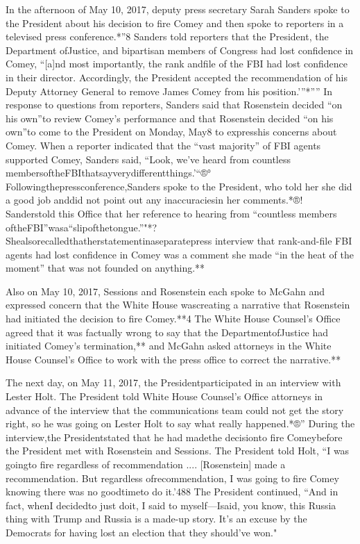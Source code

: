 {In the afternoon of May 10, 2017, deputy press secretary Sarah Sanders spoke to the President about his decision to fire Comey and then spoke to reporters in a televised press conference.*”8
Sanders told reporters that the President, the Department ofJustice, and bipartisan members of Congress had lost confidence in Comey, “[a]nd most importantly, the rank andfile of the FBI had lost confidence in their director.
Accordingly, the President accepted the recommendation of his Deputy Attorney General to remove James Comey from his position.’”*””
In response to questions from reporters, Sanders said that Rosenstein decided “on his own”to review Comey’s performance and that Rosenstein decided “on his own”to come to the President on Monday, May8 to expresshis concerns about Comey.
When a reporter indicated that the “vast majority” of FBI agents supported Comey, Sanders said, “Look, we’ve heard from countless membersoftheFBIthatsayverydifferentthings.’“®°
Followingthepressconference,Sanders spoke to the President, who told her she did a good job anddid not point out any inaccuraciesin her comments.*®!
Sanderstold this Office that her reference to hearing from “countless members oftheFBI”wasa“slipofthetongue.”"*?
Shealsorecalledthatherstatementinaseparatepress interview that rank-and-file FBI agents had lost confidence in Comey was a comment she made “in the heat of the moment” that was not founded on anything.**

Also on May 10, 2017, Sessions and Rosenstein each spoke to McGahn and expressed concern that the White House wascreating a narrative that Rosenstein had initiated the decision to fire Comey.**4
The White House Counsel’s Office agreed that it was factually wrong to say that the DepartmentofJustice had initiated Comey’s termination,**
and McGahn asked attorneys in the White House Counsel’s Office to work with the press office to correct the narrative.**

The next day, on May 11, 2017, the Presidentparticipated in an interview with Lester Holt.
The President told White House Counsel’s Office attorneys in advance of the interview that the communications team could not get the story right, so he was going on Lester Holt to say what really happened.*®”
During the interview,the Presidentstated that he had madethe decisionto fire Comeybefore the President met with Rosenstein and Sessions.
The President told Holt, “I was goingto fire regardless of recommendation .... [Rosenstein] made a recommendation.
But regardless ofrecommendation, I was going to fire Comey knowing there was no goodtimeto do it.’488
The President continued, “And in fact, whenI decidedto just doit, I said to myself—Isaid, you know, this Russia thing with Trump and Russia is a made-up story.
It’s an excuse by the Democrats for having lost an election that they should’ve won."

}
